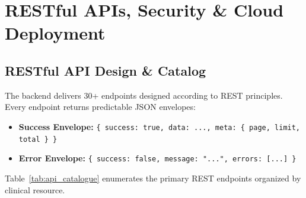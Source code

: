 \documentclass[12pt,a4paper,oneside]{report}
\begin{document}
\chapter{RESTful APIs, Security \& Cloud Deployment}

\section{RESTful API Design \& Catalog}
The backend delivers 30+ endpoints designed according to REST principles. Every endpoint returns predictable JSON envelopes:
\begin{itemize}
    \item \textbf{Success Envelope:} \texttt{\{ success: true, data: ..., meta: \{ page, limit, total \} \}}
    \item \textbf{Error Envelope:} \texttt{\{ success: false, message: "...", errors: [...] \}}
\end{itemize}

Table~\ref{tab:api_catalogue} enumerates the primary REST endpoints organized by clinical resource.
\end{document}

